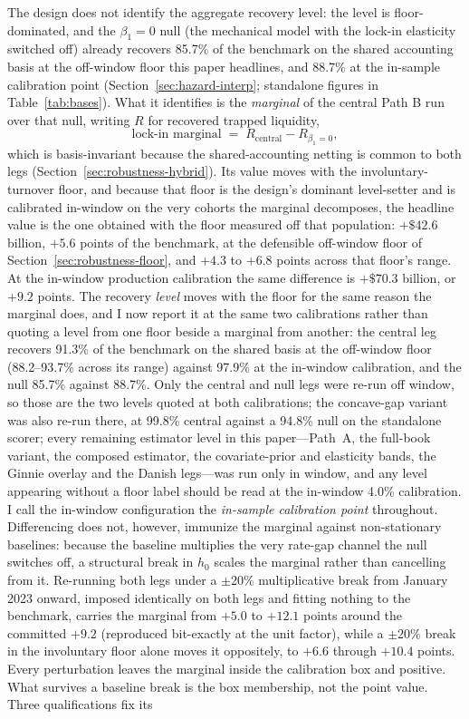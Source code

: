 \documentclass[12pt]{article}
\begin{document}
The design does not identify the aggregate recovery level: the level is floor-dominated, and the $\beta_1 = 0$ null (the mechanical model with the lock-in elasticity switched off) already recovers 85.7\% of the benchmark on the shared accounting basis at the off-window floor this paper headlines, and 88.7\% at the in-sample calibration point (Section~\ref{sec:hazard-interp}; standalone figures in Table~\ref{tab:bases}). What it identifies is the \emph{marginal} of the central Path B run over that null, writing $R$ for recovered trapped liquidity,
\begin{equation}\label{eq:marginal}
\text{lock-in marginal} \;=\; R_{\text{central}} - R_{\beta_1 = 0},
\end{equation}
which is basis-invariant because the shared-accounting netting is common to both legs (Section~\ref{sec:robustness-hybrid}). Its value moves with the involuntary-turnover floor, and because that floor is the design's dominant level-setter and is calibrated in-window on the very cohorts the marginal decomposes, the headline value is the one obtained with the floor measured off that population: $+\$42.6$ billion, $+5.6$ points of the benchmark, at the defensible off-window floor of Section~\ref{sec:robustness-floor}, and $+4.3$ to $+6.8$ points across that floor's range. At the in-window production calibration the same difference is $+\$70.3$ billion, or $+9.2$ points. The recovery \emph{level} moves with the floor for the same reason the marginal does, and I now report it at the same two calibrations rather than quoting a level from one floor beside a marginal from another: the central leg recovers 91.3\% of the benchmark on the shared basis at the off-window floor (88.2--93.7\% across its range) against 97.9\% at the in-window calibration, and the null 85.7\% against 88.7\%. Only the central and null legs were re-run off window, so those are the two levels quoted at both calibrations; the concave-gap variant was also re-run there, at 99.8\% central against a 94.8\% null on the standalone scorer; every remaining estimator level in this paper---Path~A, the full-book variant, the composed estimator, the covariate-prior and elasticity bands, the Ginnie overlay and the Danish legs---was run only in window, and any level appearing without a floor label should be read at the in-window 4.0\% calibration. I call the in-window configuration the \emph{in-sample calibration point} throughout. Differencing does not, however, immunize the marginal against non-stationary baselines: because the baseline multiplies the very rate-gap channel the null switches off, a structural break in $h_0$ scales the marginal rather than cancelling from it. Re-running both legs under a $\pm 20\%$ multiplicative break from January 2023 onward, imposed identically on both legs and fitting nothing to the benchmark, carries the marginal from $+5.0$ to $+12.1$ points around the committed $+9.2$ (reproduced bit-exactly at the unit factor), while a $\pm 20\%$ break in the involuntary floor alone moves it oppositely, to $+6.6$ through $+10.4$ points. Every perturbation leaves the marginal inside the calibration box and positive. What survives a baseline break is the box membership, not the point value. Three qualifications fix its 
\end{document}
